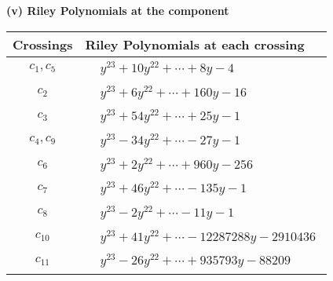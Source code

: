 \documentclass[1p]{elsarticle_modified}
\theoremstyle{definition}
\begin{document}
\newpage\renewcommand{\arraystretch}{1}
\flushleft \textbf{(v) Riley Polynomials at the component}\newline \\
\begin{tabular}{m{50pt}|m{274pt}}
Crossings & \hspace{64pt}Riley Polynomials at each crossing \\
\hline $$\begin{aligned}c_{1},c_{5}\end{aligned}$$&$\begin{aligned}
&y^{23}+10 y^{22}+\cdots+8 y-4
\end{aligned}$\\
\hline $$\begin{aligned}c_{2}\end{aligned}$$&$\begin{aligned}
&y^{23}+6 y^{22}+\cdots+160 y-16
\end{aligned}$\\
\hline $$\begin{aligned}c_{3}\end{aligned}$$&$\begin{aligned}
&y^{23}+54 y^{22}+\cdots+25 y-1
\end{aligned}$\\
\hline $$\begin{aligned}c_{4},c_{9}\end{aligned}$$&$\begin{aligned}
&y^{23}-34 y^{22}+\cdots-27 y-1
\end{aligned}$\\
\hline $$\begin{aligned}c_{6}\end{aligned}$$&$\begin{aligned}
&y^{23}+2 y^{22}+\cdots+960 y-256
\end{aligned}$\\
\hline $$\begin{aligned}c_{7}\end{aligned}$$&$\begin{aligned}
&y^{23}+46 y^{22}+\cdots-135 y-1
\end{aligned}$\\
\hline $$\begin{aligned}c_{8}\end{aligned}$$&$\begin{aligned}
&y^{23}-2 y^{22}+\cdots-11 y-1
\end{aligned}$\\
\hline $$\begin{aligned}c_{10}\end{aligned}$$&$\begin{aligned}
&y^{23}+41 y^{22}+\cdots-12287288 y-2910436
\end{aligned}$\\
\hline $$\begin{aligned}c_{11}\end{aligned}$$&$\begin{aligned}
&y^{23}-26 y^{22}+\cdots+935793 y-88209
\end{aligned}$\\
\hline
\end{tabular}\\~\\
\end{document}

